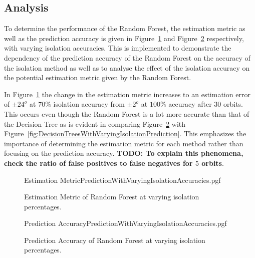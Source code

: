 \subsection{Analysis}
To determine the performance of the Random Forest, the estimation metric as well as the prediction accuracy is given in Figure~\ref{fig:RandomForestWithVaryingIsolationEstimation} and Figure~\ref{fig:RandomForestWithVaryingIsolationPrediction} respectively, with varying isolation accuracies. This is implemented to demonstrate the dependency of the prediction accuracy of the Random Forest on the accuracy of the isolation method as well as to analyse the effect of the isolation accuracy on the potential estimation metric given by the Random Forest.

In Figure~\ref{fig:RandomForestWithVaryingIsolationEstimation} the change in the estimation metric increases to an estimation error of $\pm 24^o$ at $70\%$ isolation accuracy from $\pm 2^o$ at $100\%$ accuracy after $30$ orbits. This occurs even though the Random Forest is a lot more accurate than that of the Decision Tree as is evident in comparing Figure~\ref{fig:RandomForestWithVaryingIsolationPrediction} with Figure~\ref{fig:DecisionTreesWithVaryingIsolationPrediction}. This emphasizes the importance of determining the estimation metric for each method rather than focusing on the prediction accuracy. \textbf{TODO: To explain this phenomena, check the ratio of false positives to false negatives for $5$ orbits}.
\begin{figure}[!htb]
	\centering
	{Estimation MetricPredictionWithVaryingIsolationAccuracies.pgf}
	
	\caption{Estimation Metric of Random Forest at varying isolation percentages.}
	\label{fig:RandomForestWithVaryingIsolationEstimation}
\end{figure}

\begin{figure}[!htb]
	\centering
	{Prediction AccuracyPredictionWithVaryingIsolationAccuracies.pgf}
	
	\caption{Prediction Accuracy of Random Forest at varying isolation percentages.}
	\label{fig:RandomForestWithVaryingIsolationPrediction}
\end{figure}

